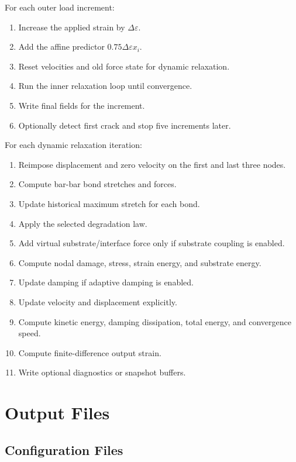 \documentclass[11pt]{article}
\begin{document}
For each outer load increment:
\begin{enumerate}
    \item Increase the applied strain by \(\Delta\varepsilon\).
    \item Add the affine predictor \(0.75\Delta\varepsilon x_i\).
    \item Reset velocities and old force state for dynamic relaxation.
    \item Run the inner relaxation loop until convergence.
    \item Write final fields for the increment.
    \item Optionally detect first crack and stop five increments later.
\end{enumerate}

For each dynamic relaxation iteration:
\begin{enumerate}
    \item Reimpose displacement and zero velocity on the first and last three nodes.
    \item Compute bar-bar bond stretches and forces.
    \item Update historical maximum stretch for each bond.
    \item Apply the selected degradation law.
    \item Add virtual substrate/interface force only if substrate coupling is enabled.
    \item Compute nodal damage, stress, strain energy, and substrate energy.
    \item Update damping if adaptive damping is enabled.
    \item Update velocity and displacement explicitly.
    \item Compute kinetic energy, damping dissipation, total energy, and convergence speed.
    \item Compute finite-difference output strain.
    \item Write optional diagnostics or snapshot buffers.
\end{enumerate}

\section{Output Files}

\subsection{Configuration Files}
\end{document}
